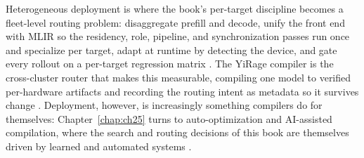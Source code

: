 Heterogeneous deployment is where the book's per-target discipline becomes a fleet-level routing problem: disaggregate prefill and decode, unify the front end with MLIR so the residency, role, pipeline, and synchronization passes run once and specialize per target, adapt at runtime by detecting the device, and gate every rollout on a per-target regression matrix \citep{patel2025llminference,iree2024,taxbreak2026}. The YiRage compiler is the cross-cluster router that makes this measurable, compiling one model to verified per-hardware artifacts and recording the routing intent as metadata so it survives change \citep{yirage2026,mpk2025}. Deployment, however, is increasingly something compilers do for themselves: Chapter~\ref{chap:ch25} turns to auto-optimization and AI-assisted compilation, where the search and routing decisions of this book are themselves driven by learned and automated systems \citep{wu2024mirage,memoryfloor2026}.

